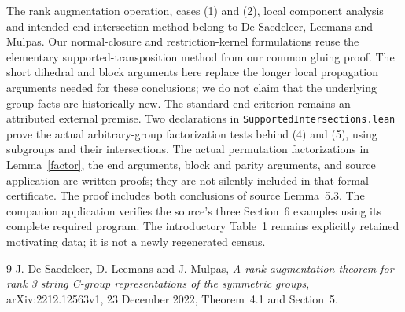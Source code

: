 \documentclass[a4paper,11pt]{article}
\begin{document}
The rank augmentation operation, cases (1) and (2), local component
analysis and intended end-intersection method belong to De Saedeleer,
Leemans and Mulpas. Our normal-closure and restriction-kernel formulations
reuse the elementary supported-transposition method from our common
gluing proof. The short dihedral and block arguments here replace the
longer local propagation arguments needed for these conclusions; we do
not claim that the underlying group facts are historically new.
The standard end criterion remains an attributed external premise.
Two declarations in \texttt{SupportedIntersections.lean} prove the actual
arbitrary-group factorization tests behind (4) and (5), using subgroups
and their intersections. The actual permutation factorizations in
Lemma~\ref{factor}, the end arguments, block and parity arguments, and
source application are written proofs; they are not silently included
in that formal certificate.
The proof includes both conclusions of source Lemma~5.3. The companion application verifies the source's three Section~6 examples
using its complete required program. The introductory Table~1 remains
explicitly retained motivating data; it is not a newly regenerated census.

\begin{thebibliography}{9}
 J. De Saedeleer, D. Leemans and J. Mulpas,
\emph{A rank augmentation theorem for rank 3 string C-group representations
of the symmetric groups}, arXiv:2212.12563v1, 23 December 2022,
Theorem~4.1 and Section~5.
\end{thebibliography}
\end{document}
